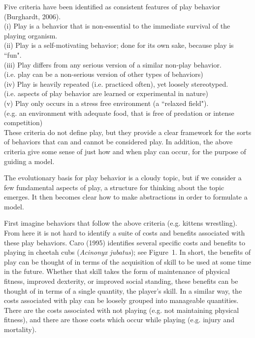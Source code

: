 \documentclass[12pt,letterpaper]{article}
\begin{document}
\indent
Five criteria have been identified as consistent features of play behavior (Burghardt, 2006). \\[6pt]
(i) Play is a behavior that is non-essential to the immediate survival of the playing organism.\\[.5pt]
(ii) Play is a self-motivating behavior; done for its own sake, because play is ``fun". \\[.5pt]
(iii) Play differs from any serious version of a similar non-play behavior.\\[.1pt]
\indent (i.e. play can be a non-serious version of other types of behaviors) \\[.5pt]
(iv) Play is heavily repeated (i.e. practiced often), yet loosely stereotyped.\\[.1pt]
\indent (i.e. aspects of play behavior are learned or experimental in nature)\\ [.5pt]
(v) Play only occurs in a stress free environment (a ``relaxed field").\\[.1pt] 
\indent (e.g. an environment with adequate food, that is free of predation or intense competition) \\[6pt]
\indent These criteria do not define play, but they provide a clear framework for the sorts of behaviors that can and cannot be considered play. 
In addition, the above criteria give some sense of just how and when play can occur, for the purpose of guiding a model.  

The evolutionary basis for play behavior is a cloudy topic, but if we consider a few fundamental aspects of play, a structure for thinking about the topic emerges. 
It then becomes clear how to make abstractions in order to formulate a model. 

First imagine behaviors that follow the above criteria (e.g. kittens wrestling).  
From here it is not hard to identify a suite of costs and benefits associated with these play behaviors.   
Caro (1995) identifies several specific costs and benefits to playing in cheetah cubs ({\it Acinonyx jubatus}); see \mbox{Figure 1}.  
In short, the benefits of play can be thought of in terms of the acquisition of skill to be used at some time in the future.
Whether that skill takes the form of maintenance of physical fitness, improved dexterity, or improved social standing, these benefits can be thought of in terms of a single quantity, the player's skill. %
In a similar way, the costs associated with play can be loosely grouped into manageable quantities.
There are the costs associated with not playing (e.g. not maintaining physical fitness), and there are those costs which occur while playing (e.g. injury and mortality).
\end{document}
